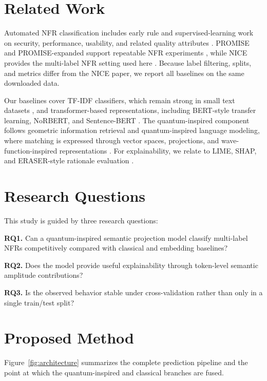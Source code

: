 \documentclass[runningheads]{llncs}
\begin{document}
\section{Related Work}
Automated NFR classification includes early rule and supervised-learning work
on security, performance, usability, and related quality attributes
\cite{clelandhuang2007automated,kurtanovic2017automatically,dalpiaz2019requirements}.
PROMISE and PROMISE-expanded support repeatable NFR experiments
\cite{mitrevski_promise_exp}, while NICE provides the multi-label NFR setting
used here \cite{nice_dataset,nice_preprint}. Because label filtering, splits,
and metrics differ from the NICE paper, we report all baselines on the same
downloaded data.

Our baselines cover TF-IDF classifiers, which remain strong in small text
datasets \cite{sebastiani2002machine}, and transformer-based representations,
including BERT-style transfer learning, NoRBERT, and Sentence-BERT
\cite{devlin2019bert,hey2020norbert,reimers2019sentencebert}. The
quantum-inspired component follows geometric information retrieval and
quantum-inspired language modeling, where matching is expressed through vector
spaces, projections, and wave-function-inspired representations
\cite{vanrijsbergen2004geometry,sordoni2013quantum,zhang2018quantum,li2019cnm}.
For explainability, we relate to LIME, SHAP, and ERASER-style rationale
evaluation \cite{ribeiro2016lime,lundberg2017shap,deyoung2020eraser}.

\section{Research Questions}
This study is guided by three research questions:

\textbf{RQ1.} Can a quantum-inspired semantic projection model classify
multi-label NFRs competitively compared with classical and embedding baselines?

\textbf{RQ2.} Does the model provide useful explainability through token-level
semantic amplitude contributions?

\textbf{RQ3.} Is the observed behavior stable under cross-validation rather than
only in a single train/test split?

\section{Proposed Method}

Figure~\ref{fig:architecture} summarizes the complete prediction pipeline and
the point at which the quantum-inspired and classical branches are fused.
\end{document}
